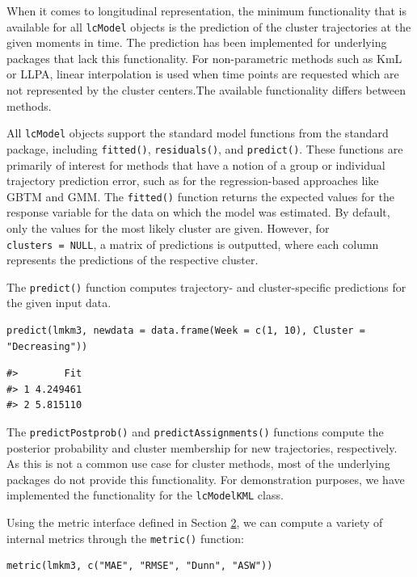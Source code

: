 When it comes to longitudinal representation, the minimum functionality that is available for all \texttt{lcModel} objects is the prediction of the cluster trajectories at the given moments in time. The prediction has been implemented for underlying packages that lack this functionality. For non-parametric methods such as KmL or LLPA, linear interpolation is used when time points are requested which are not represented by the cluster centers.The available functionality differs between methods.

All \texttt{lcModel} objects support the standard model functions from the standard  package, including \texttt{fitted()}, \texttt{residuals()}, and \texttt{predict()}. These functions are primarily of interest for methods that have a notion of a group or individual trajectory prediction error, such as for the regression-based approaches like GBTM and GMM. The \texttt{fitted()} function returns the expected values for the response variable for the data on which the model was estimated. By default, only the values for the most likely cluster are given. However, for \texttt{clusters\ =\ NULL}, a matrix of predictions is outputted, where each column represents the predictions of the respective cluster.

The \texttt{predict()} function computes trajectory- and cluster-specific predictions for the given input data.

\begin{verbatim}
predict(lmkm3, newdata = data.frame(Week = c(1, 10), Cluster = "Decreasing"))
\end{verbatim}

\begin{verbatim}
#>        Fit
#> 1 4.249461
#> 2 5.815110
\end{verbatim}

The \texttt{predictPostprob()} and \texttt{predictAssignments()} functions compute the posterior probability and cluster membership for new trajectories, respectively. As this is not a common use case for cluster methods, most of the underlying packages do not provide this functionality. For demonstration purposes, we have implemented the functionality for the \texttt{lcModelKML} class.

Using the metric interface defined in Section \hyperref[sec:methods]{2}, we can compute a variety of internal metrics through the \texttt{metric()} function:

\begin{verbatim}
metric(lmkm3, c("MAE", "RMSE", "Dunn", "ASW"))
\end{verbatim}

